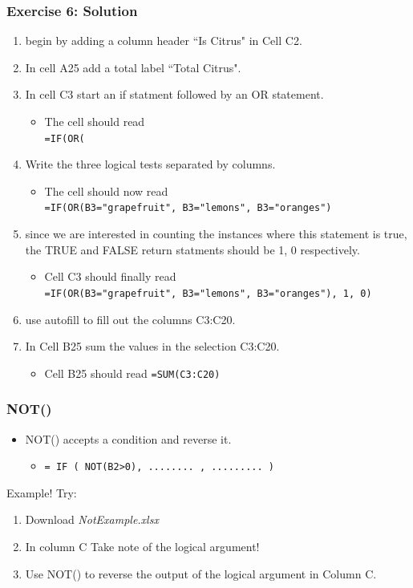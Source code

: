 \documentclass[12pt]{beamer}
\begin{document}
\begin{frame}
	\frametitle{Exercise 6: Solution}
	\begin{enumerate}
		\item begin by adding a column header ``Is Citrus" in Cell C2.
		\item In cell A25 add a total label ``Total Citrus".
		\item In cell C3 start an if statment followed by an OR statement.
			\begin{itemize}
				\item The cell should read \\
				\texttt{=IF(OR(}
			\end{itemize}
		\item Write the three logical tests separated by columns.
			\begin{itemize}
				\item The cell should now read \\
				\texttt{=IF(OR(B3="grapefruit", B3="lemons", B3="oranges")}
			\end{itemize}
		\item since we are interested in counting the instances where this statement is true, the TRUE and FALSE return statments should be 1, 0 respectively.
			\begin{itemize}
				\item Cell C3 should finally read \\
				\texttt{=IF(OR(B3="grapefruit", B3="lemons", B3="oranges"), 1, 0)}
			\end{itemize}
	\item use autofill to fill out the columns C3:C20.
	\item In Cell B25 sum the values in the selection C3:C20.
		\begin{itemize}
			\item Cell B25 should read \texttt{=SUM(C3:C20)}
		\end{itemize}
	\end{enumerate}
\end{frame}
\begin{frame}
	\frametitle{NOT()}
	\begin{itemize}
		\item NOT() accepts a condition and reverse it. 
		\begin{itemize}
			\item \texttt{= IF ( NOT(B2>0), ........ , ......... )}
		\end{itemize}
	\end{itemize}
Example! Try: 
\begin{enumerate}
	\item Download \textit{NotExample.xlsx}
	\item In column C Take note of the logical argument!
	\item Use NOT() to reverse the output of the logical argument in Column C.
\end{enumerate}
	
\end{frame}
\end{document}

